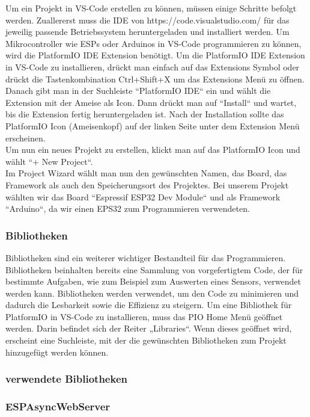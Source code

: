 \documentclass[ngerman,12pt,a4paper]{article}
\begin{document}
	 Um ein Projekt in VS-Code erstellen zu können, müssen einige Schritte befolgt werden. Zuallererst muss die IDE von https://code.visualstudio.com/ für das jeweilig passende Betriebssystem heruntergeladen und installiert werden. Um Mikrocontroller wie ESPs oder Arduinos in VS-Code programmieren zu können, wird die PlatformIO IDE Extension benötigt. Um die PlatformIO IDE Extension in VS-Code zu installieren, drückt man einfach auf das Extensions Symbol oder drückt die Tastenkombination Ctrl+Shift+X um das Extensions Menü zu öffnen. Danach gibt man in der Suchleiste “PlatformIO IDE“ ein und wählt die Extension mit der Ameise als Icon. Dann drückt man auf “Install“ und wartet, bis die Extension fertig heruntergeladen ist. Nach der Installation sollte das PlatformIO Icon (Ameisenkopf) auf der linken Seite unter dem Extension Menü erscheinen. \\[0.5cm]
	 Um nun ein neues Projekt zu erstellen, klickt man auf das PlatformIO Icon und wählt “+ New Project“. \\[0.5cm]
	 Im Project Wizard wählt man nun den gewünschten Namen, das Board, das Framework als auch den Speicherungsort des Projektes. Bei unserem Projekt wählten wir das Board “Espressif ESP32 Dev Module“ und als Framework “Arduino“, da wir einen EPS32 zum Programmieren verwendeten. \\[0.5cm]
	 	
	 	
	 	\subsubsection{Bibliotheken}
	 	
	 Bibliotheken sind ein weiterer wichtiger Bestandteil für das Programmieren. Bibliotheken beinhalten bereits eine Sammlung von vorgefertigtem Code, der für bestimmte Aufgaben, wie zum Beispiel zum Auswerten eines Sensors, verwendet werden kann. Bibliotheken werden verwendet, um den Code zu minimieren und dadurch die Lesbarkeit sowie die Effizienz zu steigern. Um eine Bibliothek für PlatformIO in VS-Code zu installieren, muss das PIO Home Menü geöffnet werden. Darin befindet sich der Reiter „Libraries“. Wenn dieses geöffnet wird, erscheint eine Suchleiste, mit der die gewünschten Bibliotheken zum Projekt hinzugefügt werden können.
	 
		\subsubsection{verwendete Bibliotheken}
		
			\subsubsection*{ESPAsyncWebServer}
			
\end{document}
